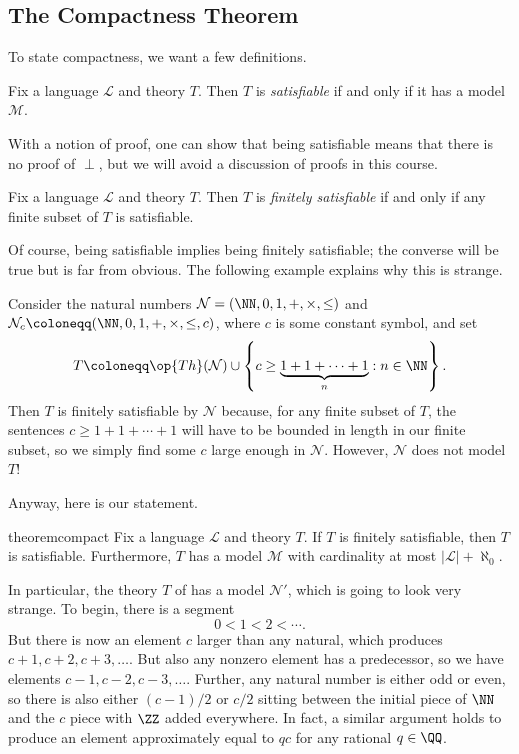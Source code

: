 \documentclass[../notes.tex]{subfiles}
\begin{document}
\subsection{The Compactness Theorem}
To state compactness, we want a few definitions.
\begin{definition}[satisfiable]
	Fix a language $\mathcal L$ and theory $T$. Then $T$ is \textit{satisfiable} if and only if it has a model $\mathcal M$.
\end{definition}
With a notion of proof, one can show that being satisfiable means that there is no proof of $\perp$, but we will avoid a discussion of proofs in this course.
\begin{definition}
	Fix a language $\mathcal L$ and theory $T$. Then $T$ is \textit{finitely satisfiable} if and only if any finite subset of $T$ is satisfiable.
\end{definition}
Of course, being satisfiable implies being finitely satisfiable; the converse will be true but is far from obvious. The following example explains why this is strange.
\begin{example} \label{ex:non-standard-n}
	Consider the natural numbers $\mathcal N=(\NN,0,1,+,\times,\le)$ and $\mathcal N_c\coloneqq(\NN,0,1,+,\times,\le,c)$, where $c$ is some constant symbol, and set
	\[T\coloneqq\op{Th}(\mathcal N)\cup\left\{c\ge\underbrace{1+1+\cdots+1}_n:n\in\NN\right\}.\]
	Then $T$ is finitely satisfiable by $\mathcal N$ because, for any finite subset of $T$, the sentences $c\ge1+1+\cdots+1$ will have to be bounded in length in our finite subset, so we simply find some $c$ large enough in $\mathcal N$. However, $\mathcal N$ does not model $T$!
\end{example}
Anyway, here is our statement.
\begin{restatable}[compactness]{theorem}{compact} \label{thm:compactness}
	Fix a language $\mathcal L$ and theory $T$. If $T$ is finitely satisfiable, then $T$ is satisfiable. Furthermore, $T$ has a model $\mathcal M$ with cardinality at most $\left|\mathcal L\right|+\aleph_0$.
\end{restatable}
\begin{remark}
	In particular, the theory $T$ of  has a model $\mathcal N'$, which is going to look very strange. To begin, there is a segment
	\[0<1<2<\cdots.\]
	But there is now an element $c$ larger than any natural, which produces $c+1,c+2,c+3,\ldots$. But also any nonzero element has a predecessor, so we have elements $c-1,c-2,c-3,\ldots$. Further, any natural number is either odd or even, so there is also either $(c-1)/2$ or $c/2$ sitting between the initial piece of $\NN$ and the $c$ piece with $\ZZ$ added everywhere. In fact, a similar argument holds to produce an element approximately equal to $qc$ for any rational $q\in\QQ$.
\end{remark}
\end{document}
